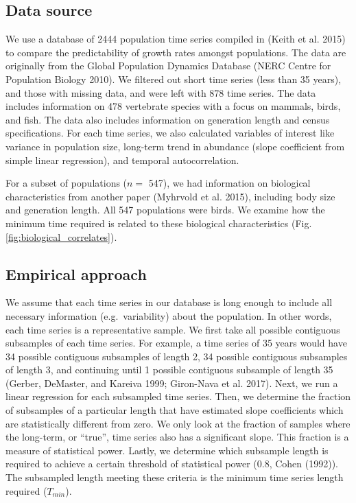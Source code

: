 \documentclass[12pt,]{article}
\begin{document}
\subsection{Data source}\label{data-source}

We use a database of 2444 population time series compiled in (Keith et
al. 2015) to compare the predictability of growth rates amongst
populations. The data are originally from the Global Population Dynamics
Database (NERC Centre for Population Biology 2010). We filtered out
short time series (less than 35 years), and those with missing data, and
were left with 878 time series. The data includes information on 478
vertebrate species with a focus on mammals, birds, and fish. The data
also includes information on generation length and census
specifications. For each time series, we also calculated variables of
interest like variance in population size, long-term trend in abundance
(slope coefficient from simple linear regression), and temporal
autocorrelation.

For a subset of populations (\(n =\) 547), we had information on
biological characteristics from another paper (Myhrvold et al. 2015),
including body size and generation length. All 547 populations were
birds. We examine how the minimum time required is related to these
biological characteristics (Fig. \ref{fig:biological_correlates}).

\subsection{Empirical approach}\label{empirical-approach}

We assume that each time series in our database is long enough to
include all necessary information (e.g.~variability) about the
population. In other words, each time series is a representative sample.
We first take all possible contiguous subsamples of each time series.
For example, a time series of 35 years would have 34 possible contiguous
subsamples of length 2, 34 possible contiguous subsamples of length 3,
and continuing until 1 possible contiguous subsample of length 35
(Gerber, DeMaster, and Kareiva 1999; Giron-Nava et al. 2017). Next, we
run a linear regression for each subsampled time series. Then, we
determine the fraction of subsamples of a particular length that have
estimated slope coefficients which are statistically different from
zero. We only look at the fraction of samples where the long-term, or
``true'', time series also has a significant slope. This fraction is a
measure of statistical power. Lastly, we determine which subsample
length is required to achieve a certain threshold of statistical power
(0.8, Cohen (1992)). The subsampled length meeting these criteria is the
minimum time series length required (\(T_{min}\)).
\end{document}
